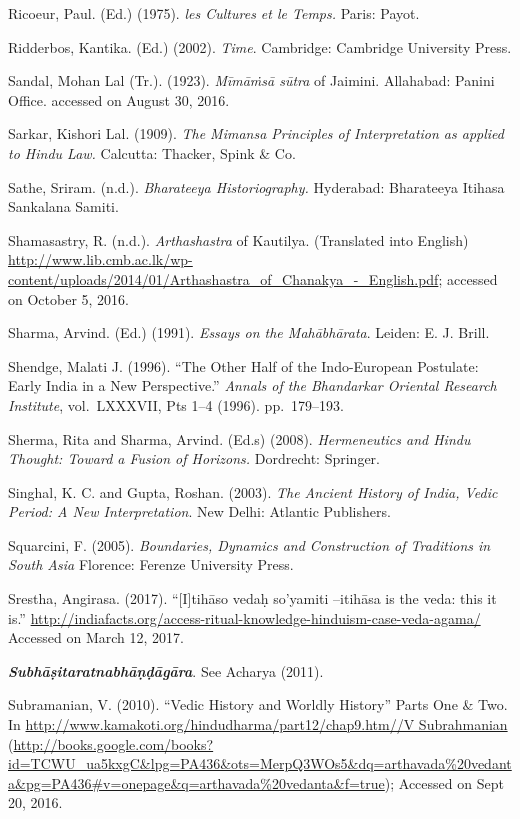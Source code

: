 \begin{thebibliography}{99}
  Ricoeur, Paul. (Ed.) (1975). \textit{les Cultures et le Temps.} Paris: Payot.

  Ridderbos, Kantika. (Ed.) (2002). \textit{Time}. Cambridge: Cambridge University Press.

  Sandal, Mohan Lal (Tr.). (1923). \textit{Mīmāṁsā sūtra} of Jaimini. Allahabad: Panini Office. accessed on August 30, 2016.

  Sarkar, Kishori Lal. (1909). \textit{The Mimansa Principles of Interpretation as applied to Hindu Law.} Calcutta: Thacker, Spink \& Co. 

  Sathe, Sriram. (n.d.). \textit{Bharateeya Historiography.} Hyderabad: Bharateeya Itihasa Sankalana Samiti.

  Shamasastry, R. (n.d.). \textit{Arthashastra} of Kautilya. (Translated into English) \url{http://www.lib.cmb.ac.lk/wp-content/uploads/2014/01/Arthashastra_of_Chanakya_-_English.pdf}; accessed on October 5, 2016.

  Sharma, Arvind. (Ed.) (1991). \textit{Essays on the Mahābhārata}. Leiden: E. J. Brill.

  Shendge, Malati J. (1996). “The Other Half of the Indo-European Postulate: Early India in a New Perspective.” \textit{Annals of the Bhandarkar Oriental Research Institute}, vol.~LXXXVII, Pts 1--4 (1996). pp.~179--193.

  Sherma, Rita and Sharma, Arvind. (Ed.s) (2008). \textit{Hermeneutics and Hindu Thought: Toward a Fusion of Horizons.} Dordrecht: Springer.

  Singhal, K. C. and Gupta, Roshan. (2003). \textit{The Ancient History of India, Vedic Period: A New Interpretation}. New Delhi: Atlantic Publishers.

  Squarcini, F. (2005). \textit{Boundaries, Dynamics and Construction of Traditions in South Asia} Florence: Ferenze University Press.

  Srestha, Angirasa. (2017). “[I]tihāso vedaḥ so’yamiti –itihāsa is the veda: this it is.” \url{http://indiafacts.org/access-ritual-knowledge-hinduism-case-veda-agama/} Accessed on March 12, 2017.

  \textbf{\textit{Subhāṣitaratnabhāṇḍāgāra}}. See Acharya (2011).

  Subramanian, V. (2010). “Vedic History and Worldly History” Parts One \& Two. In \url{http://www.kamakoti.org/hindudharma/part12/chap9.htm//V Subrahmanian} (\url{http://books.google.com/books?id=TCWU_ua5kxgC&lpg=PA436&ots=MerpQ3WOs5&dq=arthavada%20vedanta&pg=PA436#v=onepage&q=arthavada%20vedanta&f=true}); Accessed on Sept 20, 2016.


\end{thebibliography}

